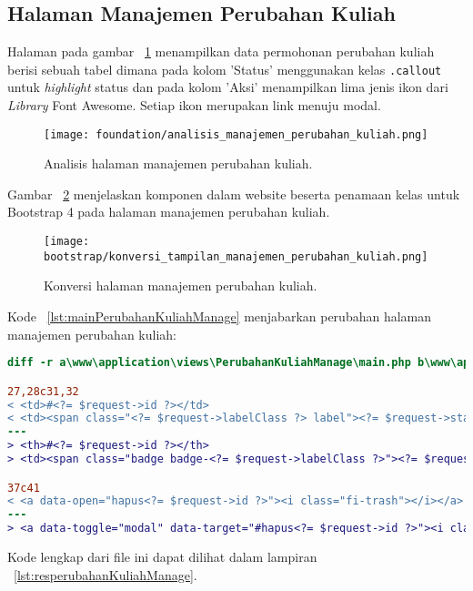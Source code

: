 \subsection{Halaman Manajemen Perubahan Kuliah}
Halaman pada gambar ~\ref{fig:analisisManajemenPerubahanKuliah} menampilkan data permohonan perubahan kuliah berisi sebuah tabel dimana pada kolom 'Status' menggunakan kelas \texttt{.callout} untuk \textit{highlight} status dan pada kolom 'Aksi' menampilkan lima jenis ikon dari \textit{Library} Font Awesome. Setiap ikon merupakan link menuju modal.
\begin{figure} [H]
	\centering  
	\texttt{[image: foundation/analisis\_manajemen\_perubahan\_kuliah.png]}
	\caption{Analisis halaman manajemen perubahan kuliah.}
	\label{fig:analisisManajemenPerubahanKuliah}
\end{figure}
\noindent Gambar ~\ref{fig:konversiManajemenPerubahanKuliah} menjelaskan komponen dalam website beserta penamaan kelas untuk Bootstrap 4 pada halaman manajemen perubahan kuliah.\\
\begin{figure} [H]
	\centering  
	\texttt{[image: bootstrap/konversi\_tampilan\_manajemen\_perubahan\_kuliah.png]}
	\caption{Konversi halaman manajemen perubahan kuliah.}
	\label{fig:konversiManajemenPerubahanKuliah}
\end{figure}
Kode ~\ref{lst:mainPerubahanKuliahManage} menjabarkan perubahan halaman manajemen perubahan kuliah:

\begin{lstlisting}[language=diff, caption=Perubahan file \path{\views\PerubahanKuliahManage\main.php},  basicstyle=\ttfamily, frame=single,
columns=fullflexible, keepspaces=true, breaklines=true, label={lst:mainPerubahanKuliahManage}]
diff -r a\www\application\views\PerubahanKuliahManage\main.php b\www\application\views\PerubahanKuliahManage\main.php

27,28c31,32
< <td>#<?= $request->id ?></td>
< <td><span class="<?= $request->labelClass ?> label"><?= $request->status ?></span></td>
---
> <th>#<?= $request->id ?></th>
> <td><span class="badge badge-<?= $request->labelClass ?>"><?= $request->status ?></span></td>

37c41
< <a data-open="hapus<?= $request->id ?>"><i class="fi-trash"></i></a>
---
> <a data-toggle="modal" data-target="#hapus<?= $request->id ?>"><i class="fas fa-trash"></i></a>

\end{lstlisting}
Kode lengkap dari file ini dapat dilihat dalam lampiran ~\ref{lst:resperubahanKuliahManage}.

